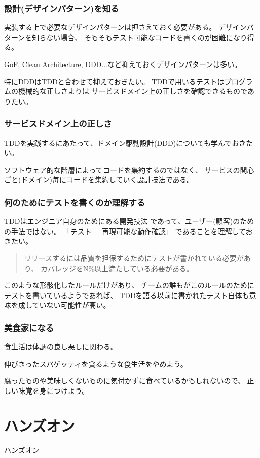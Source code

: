 \documentclass[aspectratio=169]{beamer}
\begin{document}
\begin{frame}\frametitle{設計(デザインパターン)を知る}
  {\color{blue} 実装する上で必要なデザインパターンは押さえておく必要がある。}
  {
    \color{gray}
    デザインパターンを知らない場合、
    そもそもテスト可能なコードを書くのが困難になり得る。
  }

  GoF, Clean Architecture, DDD...など抑えておくデザインパターンは多い。

  {\color{blue} 特にDDDはTDDと合わせて抑えておきたい。}
  {
    \color{gray}
    TDDで用いるテストはプログラムの機械的な正しさよりは
    サービスドメイン上の正しさを確認できるものでありたい。
  }
\end{frame}

\begin{frame}\frametitle{サービスドメイン上の正しさ}
  TDDを実践するにあたって、ドメイン駆動設計(DDD)についても学んでおきたい。

  ソフトウェア的な階層によってコードを集約するのではなく、
  サービスの関心ごと(ドメイン)毎にコードを集約していく設計技法である。

\end{frame}

\begin{frame}\frametitle{何のためにテストを書くのか理解する}
  {\color{blue} TDDはエンジニア自身のためにある開発技法}
  であって、ユーザー(顧客)のための手法ではない。
  {\color{blue} 「テスト = 再現可能な動作確認」}
  であることを理解しておきたい。
  \begin{quote}
    \color{gray}
    リリースするには品質を担保するためにテストが書かれている必要があり、
    カバレッジをN\%以上満たしている必要がある。
  \end{quote}
  このような形骸化したルールだけがあり、
  チームの誰もがこのルールのためにテストを書いているようであれば、
  TDDを語る以前に書かれたテスト自体も意味を成していない可能性が高い。
\end{frame}

\begin{frame}\frametitle{美食家になる}
  食生活は体調の良し悪しに関わる。

  伸びきったスパゲッティを貪るような食生活をやめよう。

  腐ったものや美味しくないものに気付かずに食べているかもしれないので、
  正しい味覚を身につけよう。
\end{frame}

\section{ハンズオン}
\begin{frame}
  \begin{center}
    ハンズオン
  \end{center}
\end{frame}
\end{document}

